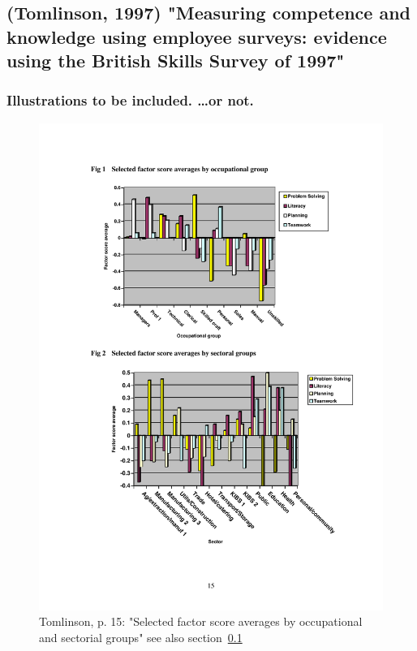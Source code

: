 \documentclass[12pt,a4paper]{article}
\begin{document}
    \subsection{(Tomlinson, 1997) "Measuring competence and knowledge using employee surveys: evidence using the British Skills Survey of 1997"}
    \label{sec:Tomlinson1997}


  \subsubsection{Illustrations to be included. …or not.}
    \begin{figure}[ht]
      \centering
      \includegraphics[width=12cm]{Meeting 7 dp50 - Seite 15.pdf}
      \caption{Tomlinson, p. 15: "Selected factor score averages by occupational and sectorial groups" see also section~\ref{sec:Tomlinson1997}}
      \label{fig:Tomlinson factorscores}
    \end{figure}
\end{document}
